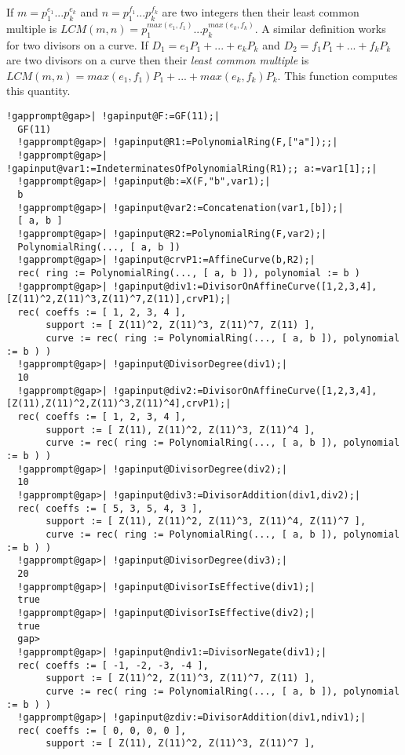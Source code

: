 \documentclass[a4paper,11pt]{report}
\begin{document}
{{{ If $m=p_1^{e_1}...p_k^{e_k}$ and $n=p_1^{f_1}...p_k^{f_k}$ are two integers then their least common multiple is $LCM(m,n)=p_1^{max(e_1,f_1)}...p_k^{max(e_k,f_k)}$. A similar definition works for two divisors on a curve. If $D_1=e_1P_1+...+e_kP_k$ and $D_2=f_1P_1+...+f_kP_k$ are two divisors on a curve then their \emph{least common multiple}  is $LCM(m,n)=max(e_1,f_1)P_1+...+max(e_k,f_k)P_k$. This function computes this quantity. 
\begin{Verbatim}[commandchars=!@|,fontsize=\small,frame=single,label=Example]
  !gapprompt@gap>| !gapinput@F:=GF(11);|
  GF(11)
  !gapprompt@gap>| !gapinput@R1:=PolynomialRing(F,["a"]);;|
  !gapprompt@gap>| !gapinput@var1:=IndeterminatesOfPolynomialRing(R1);; a:=var1[1];;|
  !gapprompt@gap>| !gapinput@b:=X(F,"b",var1);|
  b
  !gapprompt@gap>| !gapinput@var2:=Concatenation(var1,[b]);|
  [ a, b ]
  !gapprompt@gap>| !gapinput@R2:=PolynomialRing(F,var2);|
  PolynomialRing(..., [ a, b ])
  !gapprompt@gap>| !gapinput@crvP1:=AffineCurve(b,R2);|
  rec( ring := PolynomialRing(..., [ a, b ]), polynomial := b )
  !gapprompt@gap>| !gapinput@div1:=DivisorOnAffineCurve([1,2,3,4],[Z(11)^2,Z(11)^3,Z(11)^7,Z(11)],crvP1);|
  rec( coeffs := [ 1, 2, 3, 4 ], 
       support := [ Z(11)^2, Z(11)^3, Z(11)^7, Z(11) ], 
       curve := rec( ring := PolynomialRing(..., [ a, b ]), polynomial := b ) )
  !gapprompt@gap>| !gapinput@DivisorDegree(div1);|
  10
  !gapprompt@gap>| !gapinput@div2:=DivisorOnAffineCurve([1,2,3,4],[Z(11),Z(11)^2,Z(11)^3,Z(11)^4],crvP1);|
  rec( coeffs := [ 1, 2, 3, 4 ], 
       support := [ Z(11), Z(11)^2, Z(11)^3, Z(11)^4 ], 
       curve := rec( ring := PolynomialRing(..., [ a, b ]), polynomial := b ) )
  !gapprompt@gap>| !gapinput@DivisorDegree(div2);|
  10
  !gapprompt@gap>| !gapinput@div3:=DivisorAddition(div1,div2);|
  rec( coeffs := [ 5, 3, 5, 4, 3 ], 
       support := [ Z(11), Z(11)^2, Z(11)^3, Z(11)^4, Z(11)^7 ], 
       curve := rec( ring := PolynomialRing(..., [ a, b ]), polynomial := b ) )
  !gapprompt@gap>| !gapinput@DivisorDegree(div3);|
  20
  !gapprompt@gap>| !gapinput@DivisorIsEffective(div1);|
  true
  !gapprompt@gap>| !gapinput@DivisorIsEffective(div2);|
  true
  gap>
  !gapprompt@gap>| !gapinput@ndiv1:=DivisorNegate(div1);|
  rec( coeffs := [ -1, -2, -3, -4 ], 
       support := [ Z(11)^2, Z(11)^3, Z(11)^7, Z(11) ], 
       curve := rec( ring := PolynomialRing(..., [ a, b ]), polynomial := b ) )
  !gapprompt@gap>| !gapinput@zdiv:=DivisorAddition(div1,ndiv1);|
  rec( coeffs := [ 0, 0, 0, 0 ], 
       support := [ Z(11), Z(11)^2, Z(11)^3, Z(11)^7 ], 

\end{Verbatim}}}}
\end{document}
